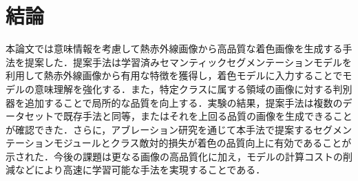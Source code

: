 \documentclass[11pt,dvipdfmx]{ujreport}
\begin{document}
\begin{figure}[tb]
\end{figure}




\chapter{結論}

本論文では意味情報を考慮して熱赤外線画像から高品質な着色画像を生成する手法を提案した．提案手法は学習済みセマンティックセグメンテーションモデルを利用して熱赤外線画像から有用な特徴を獲得し，着色モデルに入力することでモデルの意味理解を強化する．また，特定クラスに属する領域の画像に対する判別器を追加することで局所的な品質を向上する．実験の結果，提案手法は複数のデータセットで既存手法と同等，またはそれを上回る品質の画像を生成できることが確認できた．さらに，アブレーション研究を通じて本手法で提案するセグメンテーションモジュールとクラス敵対的損失が着色の品質向上に有効であることが示された．今後の課題は更なる画像の高品質化に加え，モデルの計算コストの削減などにより高速に学習可能な手法を実現することである．






%
\end{document}

